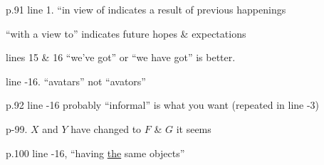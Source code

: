 
p.91 line 1. ``in view of indicates a result of previous happenings

``with a view to'' indicates future hopes \& expectations

lines 15 \& 16 ``we've got'' or ``we have got'' is better.

line -16. ``avatars'' not ``avators''

p.92 line -16 probably ``informal'' is what you want (repeated in line -3)

p-99. $X$ and $Y$ have changed to $F$ \& $G$ it seems

p.100 line -16, ``having \uline{the} same objects''


